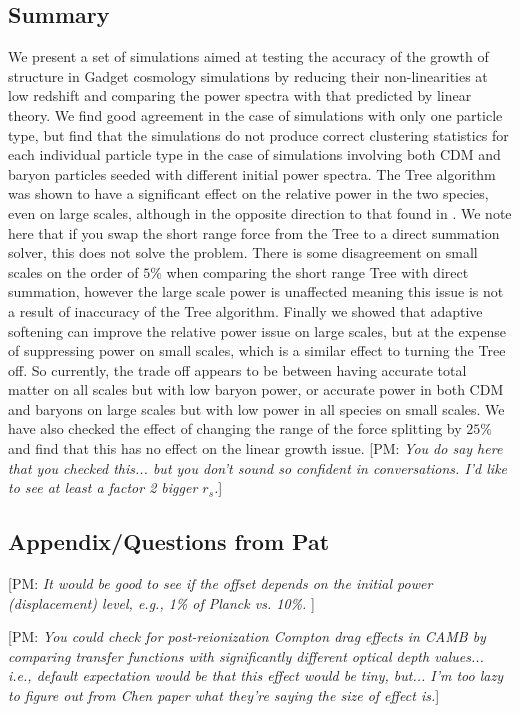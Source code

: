 \documentclass[]{article}
\def\pvm#1{[PM: {\it #1}] }
\begin{document}
\subsection{Summary}
We present a set of simulations aimed at testing the accuracy of the growth of structure in Gadget cosmology simulations by reducing their non-linearities at low redshift and comparing the power spectra with that predicted by linear theory. We find good agreement in the case of simulations with only one particle type, but find that the simulations do not produce correct clustering statistics for each individual particle type in the case of simulations involving both CDM and baryon particles seeded with different initial power spectra. The Tree algorithm was shown to have a significant effect on the relative power in the two species, even on large scales, although in the opposite direction to that found in \cite{Angulo2013}. We note here that if you swap the short range force from the Tree to a direct summation solver, this does not solve the problem. There is some disagreement on small scales on the order of $5\%$ when comparing the short range Tree with direct summation, however the large scale power is unaffected meaning this issue is not a result of inaccuracy of the Tree algorithm. Finally we showed that adaptive softening can improve the relative power issue on large scales, but at the expense of suppressing power on small scales, which is a similar effect to turning the Tree off. So currently, the trade off appears to be between having accurate total matter on all scales but with low baryon power, or accurate power in both CDM and baryons on large scales but with low power in all species on small scales. We have also checked the effect of changing the range of the force splitting by $25\%$ and find that this has no effect on the linear growth issue.
\pvm{You do say here that you checked this... but you don't sound so 
confident in conversations. I'd like to see at least a factor 2 bigger
$r_s$.}

\subsection{Appendix/Questions from Pat}

\pvm{It would be good to see if the offset depends on the initial power 
(displacement) level, e.g., 1\% of Planck vs. 10\%.
}

\pvm{You could check for post-reionization Compton drag effects in CAMB by
comparing transfer functions with significantly different optical depth
values... i.e., default expectation would be that this effect would be tiny,
but... I'm too lazy to figure out from Chen paper what they're saying the
size of effect is.} 


\end{document}
